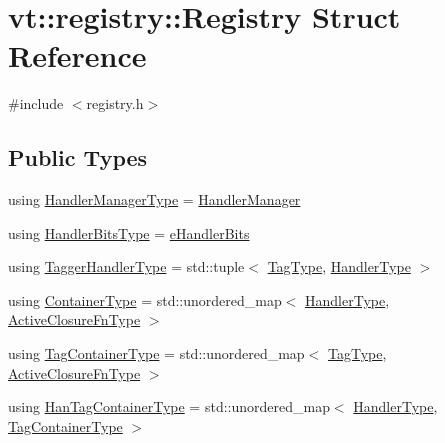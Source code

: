 \hypertarget{structvt_1_1registry_1_1_registry}{}\section{vt\+:\+:registry\+:\+:Registry Struct Reference}
\label{structvt_1_1registry_1_1_registry}


{\ttfamily \#include $<$registry.\+h$>$}

\subsection*{Public Types}
\begin{DoxyCompactItemize}
\item 
using \hyperlink{structvt_1_1registry_1_1_registry_a0717ad6519a3d2c6f3e1848182db4bfa}{Handler\+Manager\+Type} = \hyperlink{structvt_1_1_handler_manager}{Handler\+Manager}
\item 
using \hyperlink{structvt_1_1registry_1_1_registry_acf13f3553c4f5c82dd9bd1cb716d435f}{Handler\+Bits\+Type} = \hyperlink{namespacevt_af182285b57b225b163d5d8aff03cb8c2}{e\+Handler\+Bits}
\item 
using \hyperlink{structvt_1_1registry_1_1_registry_aed8ec48ac909aea3e4dbc21aa6f8e898}{Tagger\+Handler\+Type} = std\+::tuple$<$ \hyperlink{namespacevt_a84ab281dae04a52a4b243d6bf62d0e52}{Tag\+Type}, \hyperlink{namespacevt_af64846b57dfcaf104da3ef6967917573}{Handler\+Type} $>$
\item 
using \hyperlink{structvt_1_1registry_1_1_registry_ac9e1297d26b6c553ccdaa46858cdb3b8}{Container\+Type} = std\+::unordered\+\_\+map$<$ \hyperlink{namespacevt_af64846b57dfcaf104da3ef6967917573}{Handler\+Type}, \hyperlink{namespacevt_a2a06c34cafcd511828f16cbf1476b924}{Active\+Closure\+Fn\+Type} $>$
\item 
using \hyperlink{structvt_1_1registry_1_1_registry_abefc9cdcc8557c5d547dd3ae44ae0996}{Tag\+Container\+Type} = std\+::unordered\+\_\+map$<$ \hyperlink{namespacevt_a84ab281dae04a52a4b243d6bf62d0e52}{Tag\+Type}, \hyperlink{namespacevt_a2a06c34cafcd511828f16cbf1476b924}{Active\+Closure\+Fn\+Type} $>$
\item 
using \hyperlink{structvt_1_1registry_1_1_registry_ab5d336044aee749d39c8feabe4fa6983}{Han\+Tag\+Container\+Type} = std\+::unordered\+\_\+map$<$ \hyperlink{namespacevt_af64846b57dfcaf104da3ef6967917573}{Handler\+Type}, \hyperlink{structvt_1_1registry_1_1_registry_abefc9cdcc8557c5d547dd3ae44ae0996}{Tag\+Container\+Type} $>$
\end{DoxyCompactItemize}

